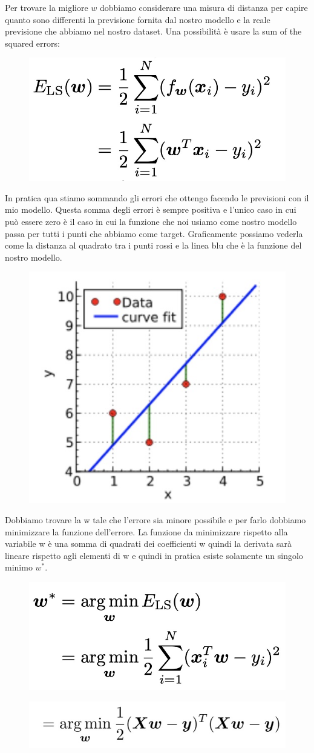 \documentclass[14pt]{extreport}
\begin{document}
Per trovare la migliore $w$ dobbiamo considerare una misura di distanza per capire quanto sono differenti la previsione fornita dal nostro modello e
la reale previsione che abbiamo nel nostro dataset. Una possibilità è usare la sum of the squared errors:

\begin{figure}[H]
	\centering
	\includegraphics[width=0.4\linewidth]{65.jpeg}
\end{figure}

In pratica qua stiamo sommando gli errori che ottengo facendo le previsioni con il mio modello. Questa somma degli errori è sempre positiva e l'unico
caso in cui può essere zero è il caso in cui la funzione che noi usiamo come nostro modello passa per tutti i punti che abbiamo come target.
Graficamente possiamo vederla come la distanza al quadrato tra i punti rossi e la linea blu che è la funzione del nostro modello.

\begin{figure}[H]
	\centering
	\includegraphics[width=0.3\linewidth]{66.jpeg}
\end{figure}

Dobbiamo trovare la w tale che l'errore sia minore possibile e per farlo dobbiamo minimizzare la funzione dell'errore. La funzione da minimizzare
rispetto alla variabile w è una somma di quadrati dei coefficienti w quindi la derivata sarà lineare rispetto agli elementi di w e quindi in pratica
esiste solamente un singolo minimo $w^*$.
\begin{figure}[H]
	\centering
	\includegraphics[width=0.4\linewidth]{67.jpeg}
\end{figure}
\begin{figure}[H]
	\centering
	\includegraphics[width=0.4\linewidth]{68.jpeg}
\end{figure}
\end{document}
